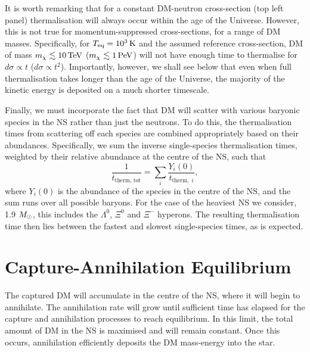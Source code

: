 It is worth remarking that for a constant DM-neutron cross-section (top left panel) thermalisation will always occur within the age of the Universe. However, this is not true for momentum-suppressed cross-sections, for a range of DM masses. Specifically, for $T_{\rm eq}=10^3{\rm \,K}$ and the assumed reference cross-section,  DM of mass $m_\chi\lesssim 10 {\rm \,TeV}$ ($m_\chi\lesssim 1 {\rm \,PeV}$)  will not have enough time to  thermalise  for $d\sigma \propto t$ ($d\sigma \propto t^2$).
Importantly, however, we shall see below that even when full thermalisation takes longer than the age of the Universe, the majority of the kinetic energy is deposited on a much shorter timescale.



Finally, we must incorporate the fact that DM will scatter with various baryonic species in the NS rather than just the neutrons. To do this, the thermalisation times from scattering off each species are combined appropriately based on their abundances. Specifically, we sum the inverse single-species thermalisation times, weighted by their relative abundance at the centre of the NS, such that
\begin{equation}
    \frac{1}{t_{\text{therm},\; \text{tot}}} = \sum_i \frac{Y_i(0)}{t_{\text{therm},\;i}},
    \label{eq:tthermtot}
\end{equation}
where $Y_i(0)$ is the abundance of the species in the centre of the NS, and the sum runs over all possible baryons. For the case of the heaviest NS we consider, 1.9 $M_\odot$, this includes the $\Lambda^0$, $\Xi^0$ and $\Xi^-$ hyperons. The resulting thermalisation time then lies between the fastest and slowest single-species times, as is expected.










\section{Capture-Annihilation Equilibrium}
\label{sec:CAEquilibrium}




The captured DM will accumulate in the centre of the NS, where it will begin to annihilate. The annihilation rate will grow until sufficient time has elapsed for the capture and annihilation processes to reach equilibrium. In this limit, the total amount of DM in the NS is maximised and will remain constant. Once this occurs, annihilation efficiently deposits the DM mass-energy into the star. 


